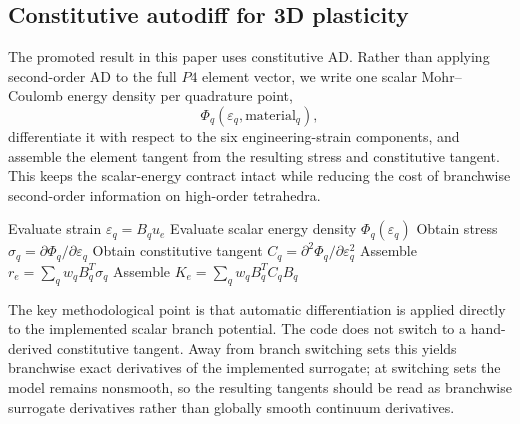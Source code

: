 \subsection{Constitutive autodiff for 3D plasticity}

The promoted \plasticitythree{} result in this paper uses constitutive AD.
Rather than applying second-order AD to the full $P4$ element vector, we write
one scalar Mohr--Coulomb energy density per quadrature point,
\begin{equation}
  \Phi_q(\varepsilon_q,\mathrm{material}_q),
\end{equation}
differentiate it with respect to the six engineering-strain components, and
assemble the element tangent from the resulting stress and constitutive tangent.
This keeps the scalar-energy contract intact while reducing the cost of
branchwise second-order information on high-order tetrahedra.

\begin{algorithm}[H]
\caption{Constitutive AD assembly for high-order plasticity}
\begin{algorithmic}[1]
    \State Evaluate strain $\varepsilon_q = B_q u_e$
    \State Evaluate scalar energy density $\Phi_q(\varepsilon_q)$
    \State Obtain stress $\sigma_q = \partial \Phi_q / \partial \varepsilon_q$
    \State Obtain constitutive tangent $C_q = \partial^2 \Phi_q / \partial \varepsilon_q^2$
  \EndFor
  \State Assemble $r_e = \sum_q w_q B_q^T \sigma_q$
  \State Assemble $K_e = \sum_q w_q B_q^T C_q B_q$
\EndFor
\end{algorithmic}
\end{algorithm}

The key methodological point is that automatic differentiation is applied
directly to the implemented scalar branch potential. The code does not switch
to a hand-derived constitutive tangent. Away from branch switching sets this
yields branchwise exact derivatives of the implemented surrogate; at switching
sets the model remains nonsmooth, so the resulting tangents should be read as
branchwise surrogate derivatives rather than globally smooth continuum
derivatives.
